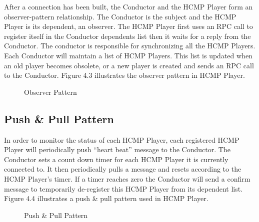 After a connection has been built, the Conductor and the HCMP Player form an 
observer-pattern relationship. The Conductor is the subject and the HCMP Player 
is its dependent, an observer. The HCMP Player first uses an RPC call to register 
itself in the Conductor dependents list then it waits for a reply from the Conductor. 
The conductor is responsible for synchronizing all the HCMP Players. Each Conductor 
will maintain a list of HCMP Players. This list is updated when an old player becomes 
obsolete, or a new player is created and sends an RPC call to the Conductor.
Figure 4.3 illustrates the observer pattern in HCMP Player.  
\begin{figure}[H]
\caption{Observer Pattern}
\end{figure}

\subsection{Push \& Pull Pattern}
In order to monitor the status of each HCMP Player, each registered HCMP Player 
will periodically push ``heart beat'' message to the Conductor.
The Conductor sets a count down timer for each HCMP Player it is currently 
connected to. It then periodically pulls a message and resets according to the 
HCMP Player's timer. If a timer reaches zero the Conductor will send a confirm 
message to temporarily de-register this HCMP Player from its dependent list. 
Figure 4.4 illustrates a push \& pull pattern used in HCMP Player.

\begin{figure}[H]
\caption{Push \& Pull Pattern}
\end{figure}

